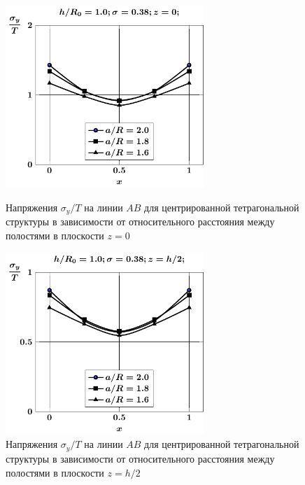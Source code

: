 \begin{figure}[h!]
\centering\footnotesize
\parbox[b]{7.5cm}{\centering\includegraphics[width=7.5cm]{cav5-a-h10-r10-z0-sig_y.pdf}
\caption{Напряжения $\sigma_y/T$ на линии $AB$ для центрированной тетрагональной структуры в зависимости от относительного расстояния между полостями в плоскости $z=0$ 
\label{f:7:97}}}\hfil\hfil
\parbox[b]{7.5cm}{\centering\includegraphics[width=7.5cm]{cav5-a-h10-r10-z1-sig_y.pdf}
\caption{Напряжения $\sigma_y/T$ на линии $AB$ для центрированной тетрагональной структуры в зависимости от относительного расстояния между полостями в плоскости $z=h/2$
\label{f:7:98}}}
\end{figure}

